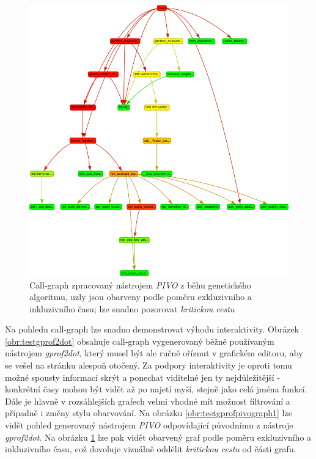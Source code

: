 \documentclass[czech,BP]{thesiskiv}
\begin{document}
\begin{figure}[h]
    \centering
    \includegraphics[interpolate,width=1.0\textwidth]{img/test-ga-pivo-graph-ratio.png}
    \caption{Call-graph zpracovaný nástrojem \emph{PIVO} z běhu genetického algoritmu, uzly jsou obarveny podle poměru exkluzivního a inkluzivního času; lze snadno pozorovat \emph{kritickou cestu}}
    \label{obr:testgprofpivograph2}
\end{figure}

\newpage

Na pohledu call-graph lze snadno demonstrovat výhodu interaktivity. Obrázek \ref{obr:testgprof2dot} obsahuje call-graph vygenerovaný běžně používaným nástrojem \emph{gprof2dot}, který musel být ale ručně oříznut v grafickém editoru, aby se vešel na stránku alespoň otočený. Za podpory interaktivity je oproti tomu možné spousty informací skrýt a ponechat viditelné jen ty nejdůležitější - konkrétní časy mohou být vidět až po najetí myší, stejně jako celá jména funkcí. Dále je hlavně v rozsáhlejších grafech velmi vhodné mít možnost filtrování a případně i změny stylu obarvování. Na obrázku \ref{obr:testgprofpivograph1} lze vidět pohled generovaný nástrojem \emph{PIVO} odpovídající původnímu z nástroje \emph{gprof2dot}. Na obrázku \ref{obr:testgprofpivograph2} lze pak vidět obarvený graf podle poměru exkluzivního a inkluzivního času, což dovoluje vizuálně oddělit \emph{kritickou cestu} od  části grafu.
\end{document}
